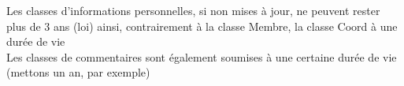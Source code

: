 Les classes d'informations personnelles, si non mises à jour, ne peuvent rester plus de 3 ans (loi) ainsi, contrairement à la classe Membre, la classe Coord à une durée de vie\\

Les classes de commentaires sont également soumises à une certaine durée de vie (mettons un an, par exemple)